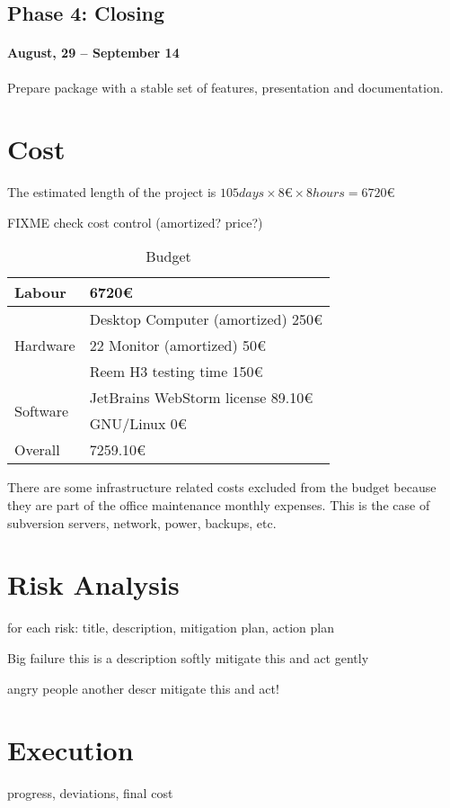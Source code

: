 \subsection{Phase 4: Closing}
\paragraph{August, 29 -- September 14}
Prepare package with a stable set of features, presentation and documentation.

\section{Cost}
\label{sec:budget}
The estimated length of the project is $105 days \times 8 \euro{} \times 8 hours = 6720 \euro{} $

FIXME check cost control (amortized? price?)

\begin{table}[ht]
    \centering
    \caption{Budget}
    \label{tab:budget}
    \begin{tabular}{| l | l |}
    \hline
    Labour & 6720\euro{} \\ \hline
    \multirow{3}{*}{Hardware} 
        & Desktop Computer (amortized) 250\euro{} \\ %
        & 22 Monitor (amortized) 50\euro{} \\
        & Reem H3 testing time 150\euro{} \\ \hline   
    \multirow{2}{*}{Software}
        & JetBrains WebStorm license 89.10\euro{} \\ %
        & GNU/Linux 0\euro{} \\ \hline
     Overall & 7259.10\euro{} \\ 
     \hline
    \end{tabular}
\end{table}

There are some infrastructure related costs excluded from the budget because they are part of the office maintenance monthly expenses.
This is the case of subversion servers, network, power, backups, etc. 

\section{Risk Analysis}
\label{sec:risk}
for each risk: title, description, mitigation plan, action plan
\begin{risk}
{Big failure}
{this is a description}
{softly mitigate this}
{and act gently}
\end{risk}

\begin{risk}
{angry people}
{another descr}
{mitigate this}
{and act!}
\end{risk}


\section{Execution}
progress, deviations, final cost
